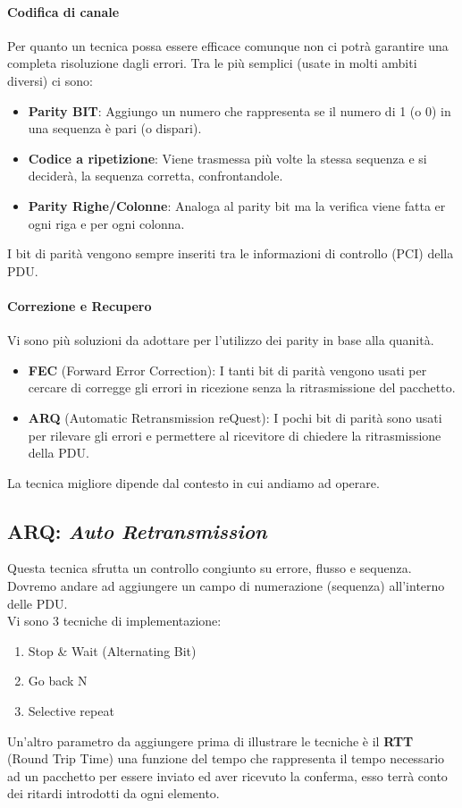 \documentclass[12pt]{article}
\begin{document}
\paragraph{Codifica di canale} Per quanto un tecnica possa essere efficace comunque non ci potrà garantire una completa risoluzione dagli errori. Tra le più semplici (usate in molti ambiti diversi) ci sono:
\begin{itemize}
  \item \textbf{Parity BIT}: Aggiungo un numero che rappresenta se il numero di 1 (o 0) in una sequenza è pari (o dispari).
  \item \textbf{Codice a ripetizione}: Viene trasmessa più volte la stessa sequenza e si deciderà, la sequenza corretta, confrontandole.
  \item \textbf{Parity Righe/Colonne}: Analoga al parity bit ma la verifica viene fatta er ogni riga e per ogni colonna.
\end{itemize}
I bit di parità vengono sempre inseriti tra le informazioni di controllo (PCI) della PDU.
\paragraph{Correzione e Recupero}
Vi sono più soluzioni da adottare per l'utilizzo dei parity in base alla quanità.
\begin{itemize}
  \item \textbf{FEC} (Forward Error Correction): I tanti bit di parità vengono usati per cercare di corregge gli errori in ricezione senza la ritrasmissione del pacchetto.
  \item \textbf{ARQ} (Automatic Retransmission reQuest): I pochi bit di parità sono usati per rilevare gli errori e permettere al ricevitore di chiedere la ritrasmissione della PDU.
\end{itemize}
La tecnica migliore dipende dal contesto in cui andiamo ad operare.

\subsection{ARQ: \textit{Auto Retransmission}}
Questa tecnica sfrutta un controllo congiunto su errore, flusso e sequenza. Dovremo andare ad aggiungere un campo di numerazione (sequenza) all'interno delle PDU.\\
Vi sono 3 tecniche di implementazione:
\begin{enumerate}
  \item Stop \& Wait (Alternating Bit)
  \item Go back N
  \item Selective repeat
\end{enumerate}
Un'altro parametro da aggiungere prima di illustrare le tecniche è il \textbf{RTT} (Round Trip Time) una funzione del tempo che rappresenta il tempo necessario ad un pacchetto per essere inviato ed aver ricevuto la conferma, esso terrà conto dei ritardi introdotti da ogni elemento.
\end{document}
